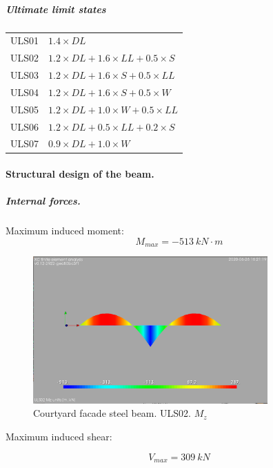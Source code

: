 \subparagraph{Ultimate limit states}
\begin{center}
  \begin{tabular}{|l|l|}
    \hline
ULS01 & $1.4 \times DL$ \\
ULS02 & $1.2 \times DL + 1.6 \times LL + 0.5 \times S$ \\
ULS03 & $1.2 \times DL + 1.6 \times S + 0.5 \times LL $ \\
ULS04 & $1.2 \times DL + 1.6 \times S + 0.5 \times W$ \\
ULS05 & $1.2 \times DL + 1.0 \times W + 0.5 \times LL $ \\
ULS06 & $1.2 \times DL + 0.5 \times LL + 0.2 \times S$ \\
ULS07 & $0.9 \times DL + 1.0 \times W$ \\
    \hline
  \end{tabular}
  \end{center}


\paragraph{Structural design of the beam.}

\subparagraph{Internal forces.}

\noindent Maximum induced moment:
\begin{equation}
  M_{max}= -513\ kN \cdot m
\end{equation}

\begin{figure}
\begin{center}
  \includegraphics[width= 90mm]{figures/courtyard_facade_beam_uls02_mz.png}
\end{center}
\caption{Courtyard facade steel beam. ULS02. $M_z$}
\end{figure}
  
\noindent Maximum induced shear:

\begin{equation}
  V_{max}= 309\ kN
\end{equation}


